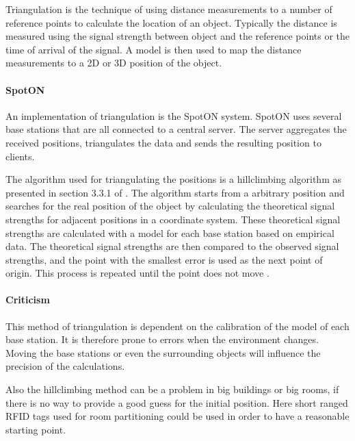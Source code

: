 Triangulation is the technique of using distance measurements to a number of reference points to calculate the location of an object.
Typically the distance is measured using the signal strength between object and the reference points or the time of arrival of the signal.
A model is then used to map the distance measurements to a 2D or 3D position of the object.\cite[4.1]{rfidreview}

\paragraph{SpotON}
An implementation of triangulation is the SpotON system\cite{spoton}.
SpotON uses several base stations that are all connected to a central server.
The server aggregates the received positions, triangulates the data and sends the resulting position to clients. \cite{spoton}

The algorithm used for triangulating the positions is a hillclimbing algorithm as presented in section 3.3.1 of \citet{spoton}.
The algorithm starts from a arbitrary position and searches for the real position of the object by calculating the theoretical signal strengths for adjacent positions in a coordinate system.
These theoretical signal strengths are calculated with a model for each base station based on empirical data.
The theoretical signal strengths are then compared to the observed signal strengths, and the point with the smallest error is used as the next point of origin.
This process is repeated until the point does not move \cite{spoton}.

\paragraph{Criticism}
This method of triangulation is dependent on the calibration of the model of each base station.
It is therefore prone to errors when the environment changes.
Moving the base stations or even the surrounding objects will influence the precision of the calculations.

Also the hillclimbing method can be a problem in big buildings or big rooms, if there is no way to provide a good guess for the initial position.
Here short ranged RFID tags used for room partitioning could be used in order to have a reasonable starting point.

